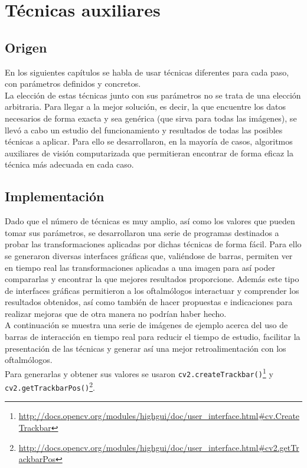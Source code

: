 \chapter{Técnicas auxiliares}
\section{Origen}
En los siguientes capítulos se habla de usar técnicas diferentes
para cada paso, con parámetros definidos y concretos. \\
La elección de estas técnicas junto con sus parámetros no se trata de
una elección arbitraria. Para llegar a la mejor solución, es decir, la
que encuentre los datos necesarios de forma exacta y sea genérica (que
sirva para todas las imágenes), se llevó a cabo un estudio del
funcionamiento y resultados de todas las posibles técnicas a aplicar.
Para ello se desarrollaron, en la mayoría de casos, algoritmos
auxiliares de visión computarizada que permitieran encontrar de forma
eficaz la técnica más adecuada en cada caso.

\section{Implementación}
Dado que el número de técnicas es muy amplio, así como los valores que
pueden tomar sus parámetros, se desarrollaron una serie de programas
destinados a probar las transformaciones aplicadas por dichas técnicas
de forma fácil. Para ello se generaron diversas interfaces gráficas
que, valiéndose de barras, permiten ver en tiempo real las
transformaciones aplicadas a una imagen para así poder compararlas y
encontrar la que mejores resultados proporcione. Además este tipo de
interfaces gráficas permitieron a los oftalmólogos interactuar y
comprender los resultados obtenidos, así como también de hacer
propuestas e indicaciones para realizar mejoras que de otra manera no
podrían haber hecho. \\

A continuación se muestra una serie de imágenes de ejemplo acerca del
uso de barras de interacción en tiempo real para reducir el tiempo de
estudio, facilitar la presentación de las técnicas y generar así una
mejor retroalimentación con los oftalmólogos.\\
Para generarlas y obtener sus valores se usaron
\texttt{cv2.createTrackbar()}\footnote{\url{http://docs.opencv.org/modules/highgui/doc/user_interface.html\#cv.CreateTrackbar}}
y
\texttt{cv2.getTrackbarPos()}\footnote{\url{http://docs.opencv.org/modules/highgui/doc/user_interface.html\#cv2.getTrackbarPos}}.

